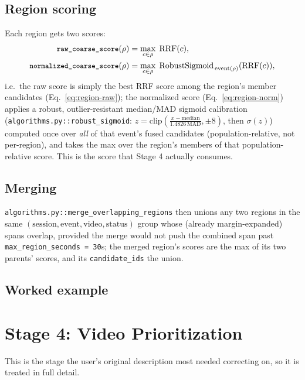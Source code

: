 \documentclass[11pt]{article}
\newcommand{\code}[1]{\texttt{\small #1}}
\newcommand{\file}[1]{\texttt{\footnotesize #1}}
\begin{document}
\subsection{Region scoring}
Each region gets two scores:
\begin{align}
  \code{raw\_coarse\_score}(\rho) &= \max_{c \in \rho} \; \mathrm{RRF}(c),
  \label{eq:region-raw}\\
  \code{normalized\_coarse\_score}(\rho) &= \max_{c \in \rho} \;
    \mathrm{RobustSigmoid}_{\,\text{event}(\rho)}(\mathrm{RRF}(c)),
  \label{eq:region-norm}
\end{align}
i.e.\ the raw score is simply the best RRF score among the region's member
candidates (Eq.~\ref{eq:region-raw}); the normalized score
(Eq.~\ref{eq:region-norm}) applies a robust, outlier-resistant
median/MAD sigmoid calibration
(\code{algorithms.py::robust\_sigmoid}: $z = \mathrm{clip}\!\left(
\frac{x - \mathrm{median}}{1.4826\,\mathrm{MAD}}, \pm 8\right)$, then
$\sigma(z)$) computed once over \emph{all} of that event's fused candidates
(population-relative, not per-region), and takes the max over the region's
members of that population-relative score. This is the score that Stage 4
actually consumes.

\subsection{Merging}
\file{algorithms.py::merge\_overlapping\_regions} then unions any two regions
in the same $(\text{session}, \text{event}, \text{video}, \text{status})$
group whose (already margin-expanded) spans overlap, provided the merge would
not push the combined span past \code{max\_region\_seconds = 30}s; the merged
region's scores are the max of its two parents' scores, and its
\code{candidate\_ids} the union.

\subsection{Worked example}


\section{Stage 4: Video Prioritization}
\label{sec:stage4}

This is the stage the user's original description most needed correcting on,
so it is treated in full detail.
\end{document}

